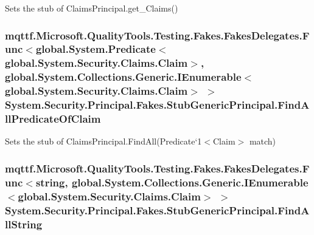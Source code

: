 Sets the stub of Claims\-Principal.\-get\-\_\-\-Claims()

\hypertarget{class_system_1_1_security_1_1_principal_1_1_fakes_1_1_stub_generic_principal_a1ac81142558efe2dd431bd8b53f7a49d}{
\subsubsection[{Find\-All\-Predicate\-Of\-Claim}]{\setlength{\rightskip}{0pt plus 5cm}mqttf.\-Microsoft.\-Quality\-Tools.\-Testing.\-Fakes.\-Fakes\-Delegates.\-Func$<$global.\-System.\-Predicate$<$global.\-System.\-Security.\-Claims.\-Claim$>$, global.\-System.\-Collections.\-Generic.\-I\-Enumerable$<$global.\-System.\-Security.\-Claims.\-Claim$>$ $>$ System.\-Security.\-Principal.\-Fakes.\-Stub\-Generic\-Principal.\-Find\-All\-Predicate\-Of\-Claim}}\label{class_system_1_1_security_1_1_principal_1_1_fakes_1_1_stub_generic_principal_a1ac81142558efe2dd431bd8b53f7a49d}


Sets the stub of Claims\-Principal.\-Find\-All(Predicate`1$<$Claim$>$ match)

\hypertarget{class_system_1_1_security_1_1_principal_1_1_fakes_1_1_stub_generic_principal_a03c3bbde7a249219ef4406e40f577b3b}{
\subsubsection[{Find\-All\-String}]{\setlength{\rightskip}{0pt plus 5cm}mqttf.\-Microsoft.\-Quality\-Tools.\-Testing.\-Fakes.\-Fakes\-Delegates.\-Func$<$string, global.\-System.\-Collections.\-Generic.\-I\-Enumerable$<$global.\-System.\-Security.\-Claims.\-Claim$>$ $>$ System.\-Security.\-Principal.\-Fakes.\-Stub\-Generic\-Principal.\-Find\-All\-String}}\label{class_system_1_1_security_1_1_principal_1_1_fakes_1_1_stub_generic_principal_a03c3bbde7a249219ef4406e40f577b3b}


